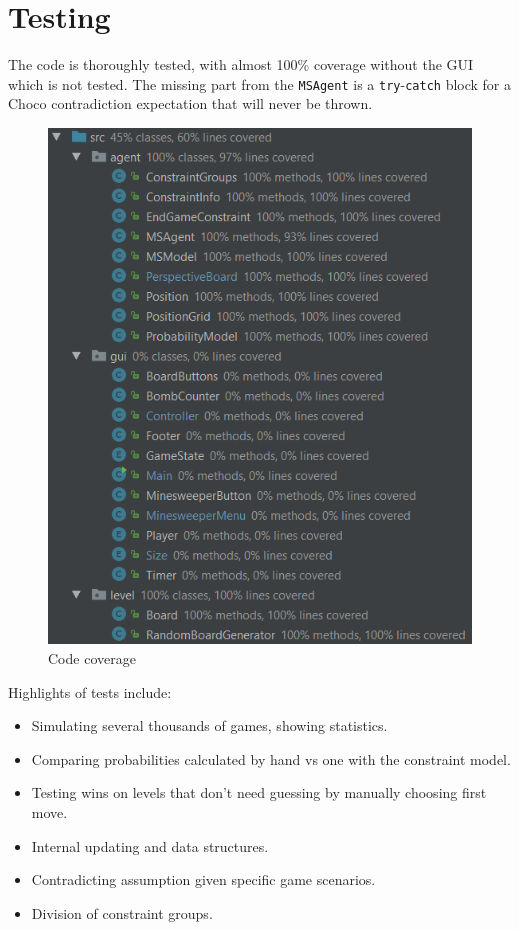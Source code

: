 \documentclass[11pt,a4paper,notitlepage]{article}
\theoremstyle{definition}
\begin{document}
\section{Testing}
The code is thoroughly tested, with almost 100\% coverage without the GUI which is not tested. The missing part from the \texttt{MSAgent} is a \texttt{try}-\texttt{catch} block for a Choco contradiction expectation that will never be thrown.
\begin{figure}[H]
\begin{center}
\includegraphics[scale=0.95]{test.png}
\end{center}
\caption{Code coverage}
\label{fig:cov}
\end{figure}
Highlights of tests include:
\begin{itemize}
\item Simulating several thousands of games, showing statistics.
\item Comparing probabilities calculated by hand vs one with the constraint model.
\item Testing wins on levels that don't need guessing by manually choosing first move.
\item Internal updating and data structures.
\item Contradicting assumption given specific game scenarios.
\item Division of constraint groups.
\end{itemize}
\end{document}
